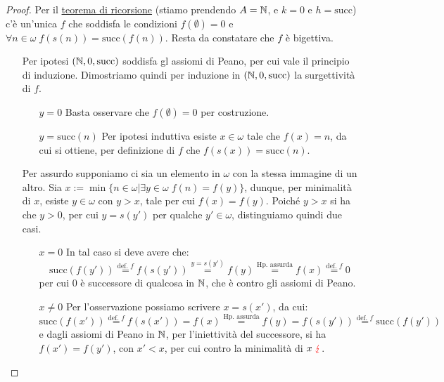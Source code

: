 \begin{proof}
	Per il \hyperref[ric1]{teorema di ricorsione} (stiamo prendendo $A = \mathbb N$, e $k = 0$ e $h = \text{succ}$) c'è un'unica $f$ che soddisfa le condizioni $f(\emptyset) = 0$ e $\forall n \in \omega \; f(s(n)) = \text{succ}(f(n))$.
	Resta da constatare che $f$ è bigettiva.
	\begin{itemize}
		\item[\boxed{\text{Surgettività}}] Per ipotesi $(\mathbb N, 0, \text{succ})$ soddisfa gl assiomi di Peano, per cui vale il principio di induzione. Dimostriamo quindi per induzione in $(\mathbb N, 0, \text{succ})$ la surgettività di $f$.
		\begin{itemize}
			\item[$\boxed{y = 0}$] Basta osservare che $f(\emptyset) = 0$ per costruzione.
			\item[$\boxed{y = \text{succ}(n)}$] Per ipotesi induttiva esiste $x \in \omega$ tale che $f(x) = n$, da cui si ottiene, per definizione di $f$ che $f(s(x)) = \text{succ}(n)$.
		\end{itemize}
		\item[\boxed{\text{Iniettività}}] Per assurdo supponiamo ci sia un elemento in $\omega$ con la stessa immagine di un altro. Sia $x :=\min\{n \in \omega | \exists y \in \omega \; f(n) = f(y)\}$, dunque, per minimalità di $x$, esiste $y \in \omega$ con $y > x$, tale per cui $f(x) = f(y)$.
		Poiché $y > x$ si ha che $y > 0$, per cui $y = s(y')$ per qualche $y' \in \omega$, distinguiamo quindi due casi.
		\begin{itemize}
			\item[$\boxed{x = 0}$] In tal caso si deve avere che:
			\[
				\text{succ}(f(y')) \overset{\text{def. $f$}}{=} f(s(y'))
								   \overset{y = s(y')}{=} f(y)
								   \overset{\text{Hp. assurda}}{=} f(x) \overset{\text{def. $f$}}{=} 0
				\]
			per cui $0$ è successore di qualcosa in $\mathbb N$, che è contro gli assiomi di Peano.
			\item[$\boxed{x \ne 0}$] Per l'osservazione possiamo scrivere $x = s(x')$, da cui:
			\[ \text{succ}(f(x')) \overset{\text{def. $f$}}{=} f(s(x')) = f(x) \overset{\text{Hp. assurda}}{=} f(y) = f(s(y')) \overset{\text{def. $f$}}{=} \text{succ}(f(y'))
				\]
			e dagli assiomi di Peano in $\mathbb N$, per l'iniettività del successore, si ha $f(x') = f(y')$, con $x' < x$, per cui contro la minimalità di $x \; \textcolor{red}\lightning$.
		\end{itemize}
	\end{itemize}
\end{proof}

